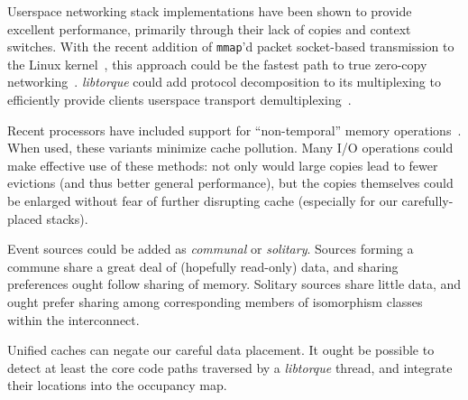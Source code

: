 \documentclass[letterpaper,10pt]{article}
\begin{document}
\begin{multicols}{2}
Userspace networking stack implementations have been shown to provide
excellent performance, primarily through their lack of copies and context
switches. With the recent addition of \texttt{mmap}'d packet socket-based
transmission to the Linux kernel~\cite{Baudy08}, this approach could be the
fastest path to true zero-copy networking~\cite{Thekkath93}. \textit{libtorque}
could add protocol decomposition to its multiplexing to efficiently
provide clients userspace transport demultiplexing~\cite{Maeda93}.

Recent processors have included support for ``non-temporal'' memory
operations~\cite{Intel09}. When used, these variants minimize cache
pollution. Many I/O operations could make effective use of these methods: not
only would large copies lead to fewer evictions (and thus better general
performance), but the copies themselves could be enlarged without fear of
further disrupting cache (especially for our carefully-placed stacks).

Event sources could be added as \textit{communal} or \textit{solitary}.
Sources forming a commune share a great deal of (hopefully read-only) data, and
sharing preferences ought follow sharing of memory. Solitary sources share little data,
and ought prefer sharing among corresponding members of isomorphism classes
within the interconnect. 

Unified caches can negate our careful data placement. It ought be possible to
detect at least the core code paths traversed by a \textit{libtorque} thread,
and integrate their locations into the occupancy map.
{}

\end{multicols}
\end{document}
